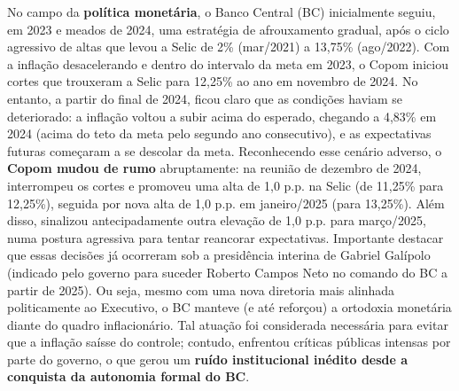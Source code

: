 \documentclass[a4paper,12pt]{article}
\begin{document}
No campo da \textbf{política monetária}, o Banco Central (BC) inicialmente seguiu, em 2023 e meados de 2024, uma estratégia de afrouxamento gradual, após o ciclo agressivo de altas que levou a Selic de 2\% (mar/2021) a 13,75\% (ago/2022). Com a inflação desacelerando e dentro do intervalo da meta em 2023, o Copom iniciou cortes que trouxeram a Selic para 12,25\% ao ano em novembro de 2024. No entanto, a partir do final de 2024, ficou claro que as condições haviam se deteriorado: a inflação voltou a subir acima do esperado, chegando a 4,83\% em 2024 (acima do teto da meta pelo segundo ano consecutivo), e as expectativas futuras começaram a se descolar da meta. Reconhecendo esse cenário adverso, o \textbf{Copom mudou de rumo} abruptamente: na reunião de dezembro de 2024, interrompeu os cortes e promoveu uma alta de 1,0 p.p. na Selic (de 11,25\% para 12,25\%), seguida por nova alta de 1,0 p.p. em janeiro/2025 (para 13,25\%). Além disso, sinalizou antecipadamente outra elevação de 1,0 p.p. para março/2025, numa postura agressiva para tentar reancorar expectativas. Importante destacar que essas decisões já ocorreram sob a presidência interina de Gabriel Galípolo (indicado pelo governo para suceder Roberto Campos Neto no comando do BC a partir de 2025). Ou seja, mesmo com uma nova diretoria mais alinhada politicamente ao Executivo, o BC manteve (e até reforçou) a ortodoxia monetária diante do quadro inflacionário. Tal atuação foi considerada necessária para evitar que a inflação saísse do controle; contudo, enfrentou críticas públicas intensas por parte do governo, o que gerou um \textbf{ruído institucional inédito desde a conquista da autonomia formal do BC}.
\end{document}
